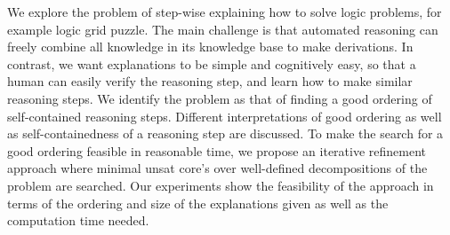 We explore the problem of step-wise explaining how to solve logic problems, for example logic grid puzzle. The main challenge is that automated reasoning can freely combine all knowledge in its knowledge base to make derivations. In contrast, we want explanations to be simple and cognitively easy, so that a human can easily verify the reasoning step, and learn how to make similar reasoning steps.
We identify the problem as that of finding a good ordering of self-contained reasoning steps. Different interpretations of good ordering as well as self-containedness of a reasoning step are discussed. To make the search for a good ordering feasible in reasonable time, we propose an iterative refinement approach where minimal unsat core's over well-defined decompositions of the problem are searched. Our experiments show the feasibility of the approach in terms of the ordering and size of the explanations given as well as the computation time needed.